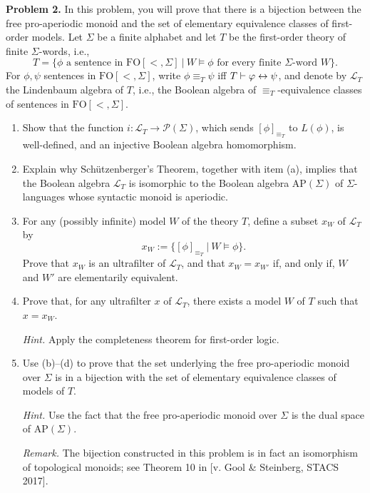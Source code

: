 {\bf Problem 2.} In this problem, you will prove that there is a bijection between the free pro-aperiodic monoid and the set of elementary equivalence classes of first-order models. Let $\Sigma$ be a finite alphabet and let $T$ be the first-order theory of finite $\Sigma$-words, i.e.,
\[ T = \{\phi \text{ a sentence in } \mathrm{FO}[<,\Sigma] \ | \ W \models \phi \text{ for every finite $\Sigma$-word $W$}\}.\]
For $\phi, \psi$ sentences in $\mathrm{FO}[<,\Sigma]$, write $\phi \equiv_T \psi$ iff $T \vdash \varphi \leftrightarrow \psi$, and denote by $\mathcal{L}_T$ the Lindenbaum algebra of $T$, i.e., the Boolean algebra of $\equiv_T$-equivalence classes of sentences in $\mathrm{FO}[<,\Sigma]$.
\begin{enumerate}
\item Show that the function $i \colon \mathcal{L}_T \to \mathcal{P}(\Sigma)$, which sends $[\phi]_{\equiv_T}$ to $L(\phi)$, is well-defined, and an injective Boolean algebra homomorphism.
\item Explain why Sch\"utzenberger's Theorem, together with item (a), implies that the Boolean algebra $\mathcal{L}_T$ is isomorphic to the Boolean algebra $\mathrm{AP}(\Sigma)$ of $\Sigma$-languages whose syntactic monoid is aperiodic. 
\item For any (possibly infinite) model $W$ of the theory $T$, define a subset $x_W$ of $\mathcal{L}_T$ by 
\[ x_W := \{[\phi]_{\equiv_T} \ | \ W \models \phi\}.\]
Prove that $x_W$ is an ultrafilter of $\mathcal{L}_T$, and that $x_W = x_{W'}$ if, and only if, $W$ and $W'$ are elementarily equivalent.
\item Prove that, for any ultrafilter $x$ of $\mathcal{L}_T$, there exists a model $W$ of $T$ such that $x = x_W$.

 {\it Hint.} Apply the completeness theorem for first-order logic.
\item Use (b)--(d) to prove that the set underlying the free pro-aperiodic monoid over $\Sigma$  is in a bijection with the set of elementary equivalence classes of models of $T$. 

{\it Hint.} Use the fact that the free pro-aperiodic monoid over $\Sigma$ is the dual space of $\mathrm{AP}(\Sigma)$.

{\it Remark.} The bijection constructed in this problem is in fact an isomorphism of topological monoids; see Theorem 10 in [v. Gool \& Steinberg, STACS 2017].
\end{enumerate}

